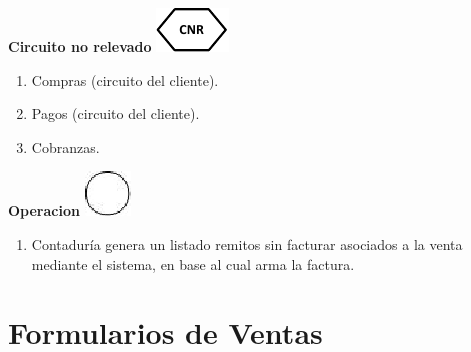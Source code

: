 \begin{center}
  \textbf{Circuito no relevado}
  \includegraphics{./Images/Simbolos/simbolo-CNR.png}
\end{center}
\begin{enumerate}
  \item Compras (circuito del cliente).
  \item Pagos (circuito del cliente).
  \item Cobranzas.
\end{enumerate}

\begin{center}
  \textbf{Operacion}
  \includegraphics{./Images/Simbolos/simbolo-Operacion.png}
\end{center}
\begin{enumerate}
  \item Contaduría genera un listado remitos sin facturar asociados a la venta mediante el sistema, en base al cual arma la factura.
\end{enumerate}

\pagebreak
\section{Formularios de Ventas}


